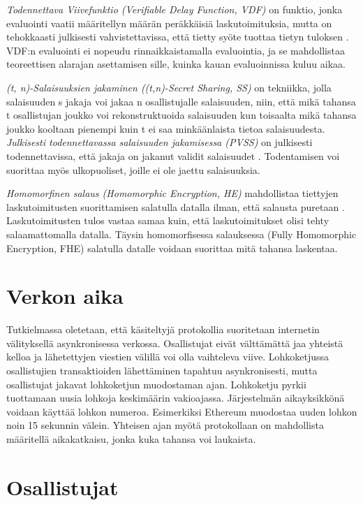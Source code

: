 \textit{Todennettava Viivefunktio (Verifiable Delay Function, VDF)} on funktio, jonka evaluointi vaatii määritellyn määrän peräkkäisiä laskutoimituksia, mutta on tehokkaasti julkisesti vahvistettavissa, että tietty syöte tuottaa tietyn tuloksen \cite{boneh_verifiable_2018}. VDF:n evaluointi ei nopeudu rinnaikkaistamalla evaluointia, ja se mahdollistaa teoreettisen alarajan asettamisen sille, kuinka kauan evaluoinnissa kuluu aikaa.

\textit{(t, n)-Salaisuuksien jakaminen ((t,n)-Secret Sharing, SS)} on tekniikka, jolla salaisuuden s jakaja voi jakaa n osallistujalle salaisuuden, niin, että mikä tahansa t osallistujan joukko voi rekonstruktuoida salaisuuden kun toisaalta mikä tahansa joukko kooltaan pienempi kuin t ei saa minkäänlaista tietoa salaisuudesta\cite{syta_scalable_2017}. \textit{Julkisesti todennettavassa salaisuuden jakamisessa (PVSS)} on julkisesti todennettavissa, että jakaja on jakanut validit salaisuudet \cite{StadlerMarkus2001PVSS}. Todentamisen voi suorittaa myös ulkopuoliset, joille ei ole jaettu salaisuuksia.

\textit{Homomorfinen salaus (Homomorphic Encryption, HE)} mahdollistaa tiettyjen laskutoimitusten suorittamisen salatulla datalla ilman, että salausta puretaan \cite{alma9928100443506253}. Laskutoimitusten tulos vastaa samaa kuin, että laskutoimitukset olisi tehty salaamattomalla datalla. Täysin homomorfisessa salauksessa (Fully Homomorphic Encryption, FHE) salatulla datalle voidaan suorittaa mitä tahansa laskentaa.


\section{Verkon aika}
Tutkielmassa oletetaan, että käsiteltyjä protokollia suoritetaan internetin välityksellä asynkronisessa verkossa. Osallistujat eivät välttämättä jaa yhteistä kelloa ja lähetettyjen viestien välillä voi olla vaihteleva viive. Lohkoketjussa osallistujien transaktioiden lähettäminen tapahtuu asynkronisesti, mutta osallistujat jakavat lohkoketjun muodostaman ajan. Lohkoketju pyrkii tuottamaan uusia lohkoja keskimäärin vakioajassa. Järjestelmän aikayksikkönä voidaan käyttää lohkon numeroa. Esimerkiksi Ethereum muodostaa uuden lohkon noin 15 sekunnin välein. Yhteisen ajan myötä protokollaan on mahdollista määritellä aikakatkaisu, jonka kuka tahansa voi laukaista.

\section{Osallistujat}

